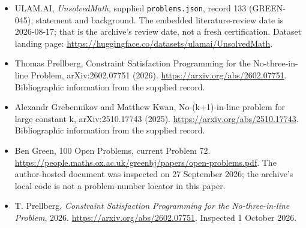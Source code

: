 \documentclass[11pt,a4paper]{article}
\begin{document}
{\small

\begin{itemize}

\item[\hypertarget{source:133:1}{S1}] ULAM.AI, \emph{UnsolvedMath}, supplied \texttt{problems.json}, record 133 (GREEN-045), statement and background. The embedded literature-review date is 2026-08-17; that is the archive’s review date, not a fresh certification. Dataset landing page: \url{https://huggingface.co/datasets/ulamai/UnsolvedMath}.

\item[\hypertarget{source:133:2}{S2}] Thomas Prellberg, Constraint Satisfaction Programming for the No-three-in-line Problem, arXiv:2602.07751 (2026). \url{https://arxiv.org/abs/2602.07751}. Bibliographic information from the supplied record.

\item[\hypertarget{source:133:3}{S3}] Alexandr Grebennikov and Matthew Kwan, No-(k+1)-in-line problem for large constant k, arXiv:2510.17743 (2025). \url{https://arxiv.org/abs/2510.17743}. Bibliographic information from the supplied record.

\item[\hypertarget{source:133:4}{S4}] Ben Green, 100 Open Problems, current Problem 72. \url{https://people.maths.ox.ac.uk/greenbj/papers/open-problems.pdf}. The author-hosted document was inspected on 27 September 2026; the archive’s local code is not a problem-number locator in this paper.

\item[E1] T. Prellberg, \emph{Constraint Satisfaction Programming for the No-three-in-line Problem}, 2026. \url{https://arxiv.org/abs/2602.07751}. Inspected 1 October 2026.

\end{itemize}

}

\label{end:133}
\end{document}
